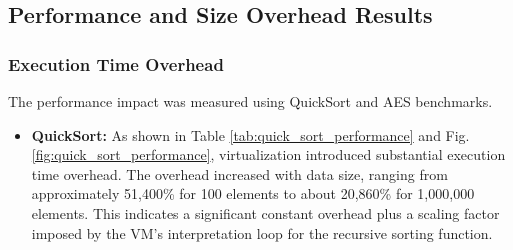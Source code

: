 \subsection{Performance and Size Overhead Results}

\subsubsection{Execution Time Overhead}
The performance impact was measured using QuickSort and AES benchmarks.

\begin{itemize}
    \item \textbf{QuickSort:} As shown in Table \ref{tab:quick_sort_performance} and Fig. \ref{fig:quick_sort_performance}, virtualization introduced substantial execution time overhead. The overhead increased with data size, ranging from approximately 51,400\% for 100 elements to about 20,860\% for 1,000,000 elements. This indicates a significant constant overhead plus a scaling factor imposed by the VM's interpretation loop for the recursive sorting function.
    \begin{table}[!t] %
        \centering
        \caption{Quick Sort Execution Time Results (ms)}
        \label{tab:quick_sort_performance}
    \end{table}


\end{itemize}

